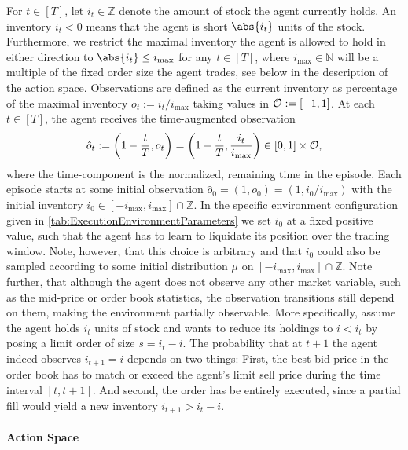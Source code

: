\documentclass[
    a4paper,
    11pt,
    bibliography=totoc,
    listof=totoc,      
    headinclude=true,
    cleardoublepage=empty,
]{scrbook}
\theoremstyle{plain}
\theoremstyle{definition}
\theoremstyle{remark}
\newcommand{\SetN}{\mathbb N}
\newcommand{\SetZ}{\mathbb Z}
\newcommand{\SpaceO}{{\cal O}}
\begin{document}
For $t\in[T]$, let $i_t \in \SetZ$ denote the amount of stock the
agent currently holds. An inventory $i_t<0$ means that the agent is short 
$\abs{i_t}$ units of the stock. Furthermore, we restrict the maximal inventory
the agent is allowed to hold in either direction to $\abs{i_t} \leq i_{\max}$
for any $t \in [T]$, where $i_{\max}\in\SetN$ will be a multiple of the fixed
order size the agent trades, see below in the description of the action space. 
Observations are defined as the current inventory as percentage of the maximal 
inventory $o_t := i_t/i_{\max}$ taking values in $\SpaceO := [-1,1]$. At each 
$t\in[T]$, the agent receives the time-augmented observation
\[
    \hat{o}_t := \biggl(1- \frac{t}{T}, o_t\biggr) 
    = \biggl(1-\frac{t}{T}, \frac{i_t}{i_{\max}}\biggr) 
    \in [0,1] \times \SpaceO,
\]
where the time-component is the normalized, remaining time in the episode. 
Each episode starts at some initial observation $\hat{o}_0 = (1, o_0) = 
(1, i_0/i_{\max})$ with the initial inventory $i_0 \in [-i_{\max}, i_{\max}] 
\cap\SetZ$. In the specific environment configuration given in 
\cref{tab:ExecutionEnvironmentParameters} we set $i_0$ at a fixed positive 
value, such that the agent has to learn to liquidate its position over the 
trading window. Note, however, that this choice is arbitrary and that $i_0$ 
could also be sampled according to some initial distribution $\mu$ on 
$[-i_{\max}, i_{\max}]\cap\SetZ$. Note further, that although the agent does 
not observe any other market variable, such as the mid-price or order book 
statistics, the observation transitions still depend on them, making the 
environment partially observable. More specifically, assume the agent holds 
$i_t$ units of stock and wants to reduce its holdings to $i < i_t$ by posing a 
limit order of size $s=i_t - i$. The probability that at $t+1$ the agent 
indeed observes $i_{t+1} = i$ depends on two things: First, the best bid price 
in the order book has to match or exceed the agent's limit sell price during 
the time interval $[t,t+1]$. And second, the order has be entirely executed, 
since a partial fill would yield a new inventory $i_{t+1} > i_t - i$.

\paragraph{Action Space}
\label{chapter:Experiments:section:Execution:sub:Environment:par:ActionSpace}
\end{document}
